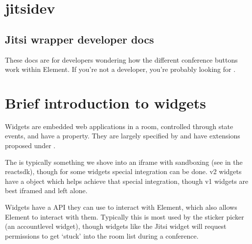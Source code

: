 \documentclass[letterpaper,10pt,openany,oneside,english]{sphinxmanual}
\begin{document}
\chapter{jitsi\sphinxhyphen{}dev}
\label{\detokenize{jitsi-dev:jitsi-dev}}\label{\detokenize{jitsi-dev::doc}}

\section{Jitsi wrapper developer docs}
\label{\detokenize{jitsi-dev:jitsi-wrapper-developer-docs}}
\sphinxAtStartPar
{}

\sphinxAtStartPar
These docs are for developers wondering how the different conference buttons work
within Element. If you’re not a developer, you’re probably looking for .


\chapter{Brief introduction to widgets}
\label{\detokenize{jitsi-dev:brief-introduction-to-widgets}}
\sphinxAtStartPar
Widgets are embedded web applications in a room, controlled through state events, and
have a  property. They are largely specified by 
and have extensions proposed under .

\sphinxAtStartPar
The  is typically something we shove into an iframe with sandboxing (see 
in the react\sphinxhyphen{}sdk), though for some widgets special integration can be done. v2 widgets
have a  object which helps achieve that special integration, though v1 widgets
are best iframed and left alone.

\sphinxAtStartPar
Widgets have a  API they can use to interact with Element, which also allows
Element to interact with them. Typically this is most used by the sticker picker (an
account\sphinxhyphen{}level widget), though widgets like the Jitsi widget will request permissions to
get ‘stuck’ into the room list during a conference.
\end{document}
